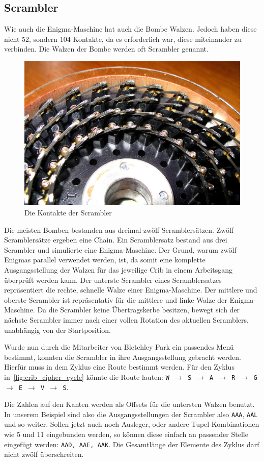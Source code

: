 \newpage

\subsection{Scrambler}\label{subsec:scrambler}
Wie auch die Enigma-Maschine hat auch die Bombe \glqq Walzen\grqq.
Jedoch haben diese nicht 52, sondern 104 Kontakte, da es erforderlich war, diese miteinander zu verbinden.
Die Walzen der Bombe werden oft Scrambler genannt.

\begin{figure}[htbp]
	\centering
	\includegraphics[width=0.4\linewidth]{Turing Bomb/WireBrushesOnBombeDrum}
	\caption{Die Kontakte der Scrambler\autocite{wiki:bombescrambler}}
	\label{fig:scrambler}
\end{figure} 


Die meisten Bomben bestanden aus dreimal zwölf Scramblersätzen.
Zwölf Scramblersätze ergeben eine \glqq Chain\grqq.
Ein Scramblersatz bestand aus drei Scrambler und simulierte eine Enigma-Maschine.
Der Grund, warum zwölf \glqq Enigmas\grqq{} parallel verwendet werden, ist, da somit eine komplette Ausgangsstellung der Walzen für das jeweilige Crib in einem Arbeitsgang überprüft werden kann.
Der unterste Scrambler eines Scramblersatzes repräsentiert die rechte, schnelle Walze einer Enigma-Maschine.
Der mittlere und oberste Scrambler ist repräsentativ für die mittlere und linke Walze der Enigma-Maschine.
Da die Scrambler keine Übertragskerbe besitzen, bewegt sich der nächste Scrambler immer nach einer vollen Rotation des aktuellen Scramblers, unabhängig von der Startposition.

Wurde nun durch die Mitarbeiter von Bletchley Park ein passendes Menü bestimmt, konnten die Scrambler in ihre Ausgangsstellung gebracht werden. 
Hierfür muss in dem Zyklus eine \glqq Route\grqq{} bestimmt werden.
Für den Zyklus in~\cref{fig:crib_cipher_cycle} könnte die Route lauten: \texttt{W $\to$ S $\to$ A $\to$ R $\to$ G $\to$ E $\to$ V $\to$ S}.

Die Zahlen auf den Kanten werden als \glqq Offsets\grqq{} für die untersten Walzen benutzt.
In unserem Beispiel sind also die Ausgangsstellungen der Scrambler also \texttt{AAA}, \texttt{AAL} und so weiter.
Sollen jetzt auch noch Ausleger, oder andere Tupel-Kombinationen wie 5 und 11 eingebunden werden, so können diese einfach an passender Stelle eingefügt werden: \texttt{AAD, AAE, AAK}.
Die Gesamtlänge der Elemente des Zyklus darf nicht zwölf überschreiten.

